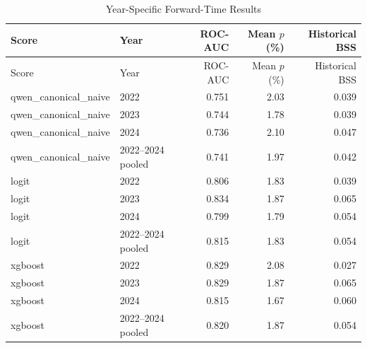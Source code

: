 {\small\begin{longtable}{@{}p{}lrrr@{}}
\caption{Year-Specific Forward-Time Results}\label{tab:a_temporal}\\
\toprule Score & Year & ROC-AUC & Mean $p$ (\%) & Historical BSS \\
\midrule\endfirsthead
\toprule Score & Year & ROC-AUC & Mean $p$ (\%) & Historical BSS \\
\midrule\endhead
qwen\_canonical\_naive & 2022 & 0.751 & 2.03 & 0.039 \\
qwen\_canonical\_naive & 2023 & 0.744 & 1.78 & 0.039 \\
qwen\_canonical\_naive & 2024 & 0.736 & 2.10 & 0.047 \\
qwen\_canonical\_naive & 2022--2024 pooled & 0.741 & 1.97 & 0.042 \\
logit & 2022 & 0.806 & 1.83 & 0.039 \\
logit & 2023 & 0.834 & 1.87 & 0.065 \\
logit & 2024 & 0.799 & 1.79 & 0.054 \\
logit & 2022--2024 pooled & 0.815 & 1.83 & 0.054 \\
xgboost & 2022 & 0.829 & 2.08 & 0.027 \\
xgboost & 2023 & 0.829 & 1.87 & 0.065 \\
xgboost & 2024 & 0.815 & 1.67 & 0.060 \\
xgboost & 2022--2024 pooled & 0.820 & 1.87 & 0.054 \\
\bottomrule\end{longtable}}
